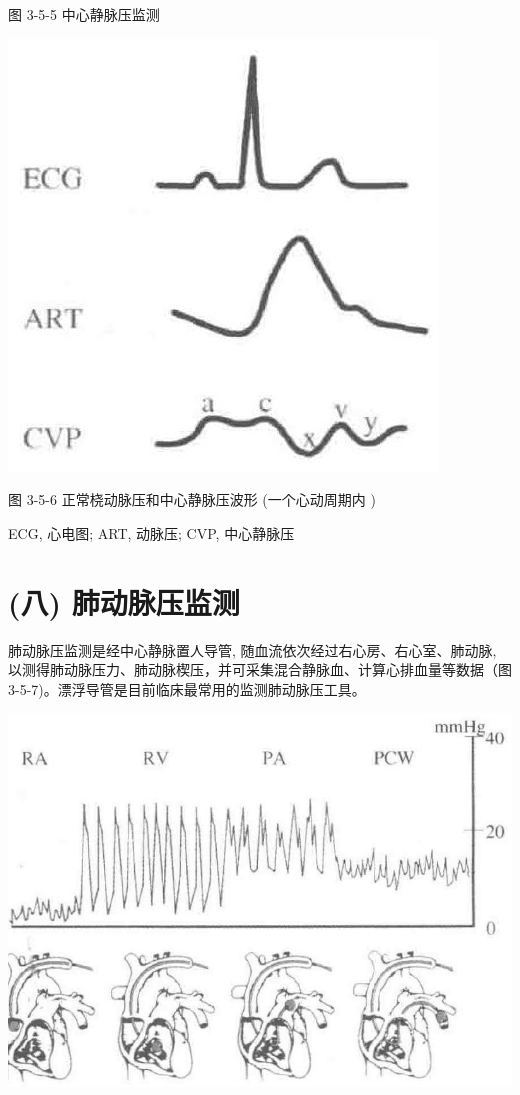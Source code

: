 \documentclass[10pt]{article}
\begin{document}
图 3-5-5 中心静脉压监测

\begin{center}
\includegraphics[max width=\textwidth]{2024_07_05_645bb794a4d4f32ee0c8g-103}
\end{center}

图 3-5-6 正常桡动脉压和中心静脉压波形 (一个心动周期内 )

ECG, 心电图; ART, 动脉压; CVP, 中心静脉压

\section*{(八) 肺动脉压监测}
肺动脉压监测是经中心静脉置人导管, 随血流依次经过右心房、右心室、肺动脉, 以测得肺动脉压力、肺动脉楔压，并可采集混合静脉血、计算心排血量等数据（图 3-5-7)。漂浮导管是目前临床最常用的监测肺动脉压工具。

\begin{center}
\includegraphics[max width=\textwidth]{2024_07_05_645bb794a4d4f32ee0c8g-104}
\end{center}
\end{document}
